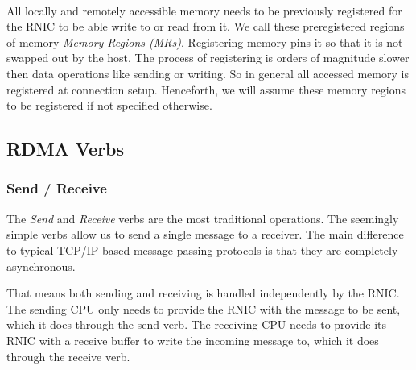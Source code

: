 \paragraph{}  All locally and remotely accessible memory needs to be previously registered for the RNIC to be able write to
or read from it. We call these preregistered regions of memory \emph{Memory Regions (MRs)}.  
Registering memory pins it so that it is not swapped out by the host. The process of registering is orders of magnitude slower 
then data operations like sending or writing. So in general all accessed memory is registered at connection setup. Henceforth,  
we will assume these memory regions to be registered if not specified otherwise.



\subsection{RDMA Verbs}\label{sec:bg:verbs}

\subsubsection{Send / Receive} \label{sec:bg:send}
The \emph{Send} and \emph{Receive} verbs are the most traditional operations. The seemingly simple verbs allow 
us to send a single message to  a receiver. The main difference to typical TCP/IP based message passing protocols is that
they are completely asynchronous.

That means both sending and receiving is handled independently by the RNIC. The sending CPU only needs to provide
the RNIC with the message to be sent, which it does through the send verb. The receiving CPU needs to provide its RNIC with 
a receive buffer to write the incoming message to, which it does through the receive verb.




